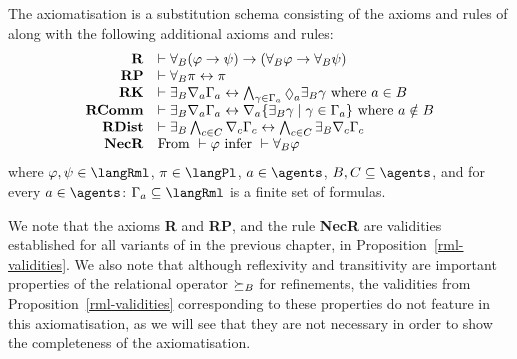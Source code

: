 \begin{definition}
    The axiomatisation \axiomRmlK{} is a substitution schema consisting of the axioms and rules of \axiomK{} along with the following additional axioms and rules:
$$
\begin{array}{rl}
    {\bf R} & \proves \allrefsBs (\phi \implies \psi) \implies (\allrefsBs \phi \implies \allrefsBs \psi)\\
    {\bf RP} & \proves \allrefsBs \pi \iff \pi\\
    {\bf RK} & \proves \somerefsBs \coversA \Gamma_\agentA \iff \bigwedge_{\gamma \in \Gamma_\agentA} \possibleA \somerefsBs \gamma \text{ where } \agentA \in \agentsB\\
    {\bf RComm} & \proves \somerefsBs \coversA \Gamma_\agentA \iff \coversA \{\somerefsBs \gamma \mid \gamma \in \Gamma_\agentA\} \text{ where } \agentA \notin \agentsB\\
    {\bf RDist} & \proves \somerefsBs \bigwedge_{\agentC \in \agentsC} \coversC \Gamma_\agentC \iff \bigwedge_{\agentC \in \agentsC} \somerefsBs \coversC \Gamma_\agentC\\
    {\bf NecR} & \text{From } \proves \phi \text{ infer } \proves \allrefsBs \phi
\end{array}
$$
where $\phi, \psi \in \langRml$, $\pi \in \langPl$, $\agentA \in \agents$, $\agentsB, \agentsC \subseteq \agents$, and for every $\agentA \in \agents$: $\Gamma_\agentA \subseteq \langRml$ is a finite set of formulas.
\end{definition}

We note that the axioms {\bf R} and {\bf RP}, and the rule {\bf NecR} are validities established for all variants of \logicRml{} in the previous chapter, in Proposition~\ref{rml-validities}.
We also note that although reflexivity and transitivity are important properties of the relational operator $\succeq_{B}$ for refinements, the validities from Proposition~\ref{rml-validities} corresponding to these properties do not feature in this axiomatisation, as we will see that they are not necessary in order to show the completeness of the axiomatisation.

